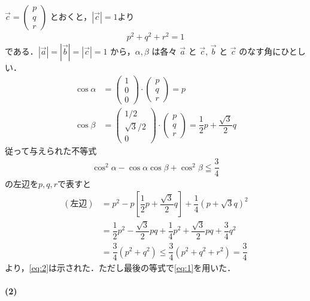 \documentclass[../../main.tex]{subfiles}
\begin{document}
$\vec{c} =
\begin{pmatrix} p \\ q \\ r
\end{pmatrix}$ とおくと，$|\vec{c}|=1$より
\begin{align}
  p^2+q^2+r^2=1 \label{eq:1}
\end{align}
である．$|\vec{a}|=|\vec{b}|=|\vec{c}|=1$ から，$\alpha, \beta$ は各々 $\vec{a}$ と $\vec{c}$, $\vec{b}$ と $\vec{c}$ のなす角にひとしい．
\begin{align}
  \cos\alpha &=
  \begin{pmatrix} 1 \\ 0 \\ 0
  \end{pmatrix} \cdot
  \begin{pmatrix} p \\ q \\ r
  \end{pmatrix} = p \\
  \cos\beta &=
  \begin{pmatrix} 1/2 \\ \sqrt{3}/2 \\ 0
  \end{pmatrix} \cdot
  \begin{pmatrix} p \\ q \\ r
  \end{pmatrix} = \dfrac{1}{2}p + \dfrac{\sqrt{3}}{2}q
\end{align}
従って与えられた不等式
\begin{align}
  \cos^2\alpha-\cos\alpha\cos\beta+\cos^2\beta\leqq\dfrac{3}{4} \label{eq:2}
\end{align}
の左辺を$p,q,r$で表すと
\begin{align}
  (\text{左辺})
  &= p^2 - p\left[\dfrac{1}{2}p + \dfrac{\sqrt{3}}{2}q\right] + \dfrac{1}{4}(p+\sqrt{3}q)^2 \\
  &= \dfrac{1}{2}p^2 - \dfrac{\sqrt{3}}{2}pq + \dfrac{1}{4}p^2 + \dfrac{\sqrt{3}}{2}pq + \dfrac{3}{4}q^2 \\
  &= \dfrac{3}{4}(p^2+q^2) \le \dfrac{3}{4}(p^2+q^2+r^2) = \dfrac{3}{4}
\end{align}
より，\cref{eq:2}は示された．ただし最後の等式で\cref{eq:1}を用いた．

\paragraph{(2)}
\end{document}
